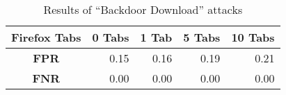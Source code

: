 \begin{table}[t]
\centering
{}
\caption{Results of ``Backdoor Download'' attacks}
\label{tab:firefox}
\begin{tabular}{c|rrrr}
\hline
\textbf{Firefox Tabs}             & \multicolumn{1}{r}{\textbf{0 Tabs}} & \multicolumn{1}{r}{\textbf{1 Tab}} & \multicolumn{1}{r}{\textbf{5 Tabs}} & \multicolumn{1}{r}{\textbf{10 Tabs}} \\ \hline
\textbf{FPR} & 0.15                     & 0.16                    & 0.19                     & 0.21                    \\
\textbf{FNR} & 0.00                        & 0.00                       & 0.00                        & 0.00                       \\ \hline
\end{tabular}
\label{tab:firefox}
\end{table}